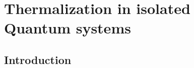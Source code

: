 \chapter{Thermalization in isolated Quantum systems}\label{Thermalization_isolated_quantum_systems}
\section{Introduction}

